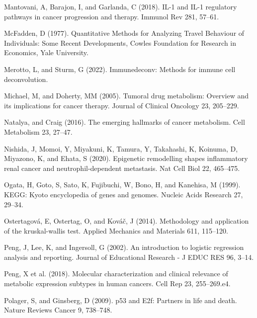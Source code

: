 \documentclass[
  parskip,
  oneside]{scrreprt}
\newlength{\cslhangindent}
\newlength{\cslentryspacingunit} %
\newenvironment{CSLReferences}[2] %
 {%
  \setlength{\parindent}{0pt}
  \ifodd #1
  \let\oldpar\par
  \def\par{\hangindent=\cslhangindent\oldpar}
  \fi
  \setlength{\parskip}{#2\cslentryspacingunit}
 }%
 {}
\begin{document}
\begin{CSLReferences}{0}{0}
\leavevmode{}%
Mantovani, A, Barajon, I, and Garlanda, C (2018). IL-1 and IL-1
regulatory pathways in cancer progression and therapy. Immunol Rev 281,
57--61.

\leavevmode{}%
McFadden, D (1977). {Quantitative Methods for Analyzing Travel Behaviour
of Individuals: Some Recent Developments}, Cowles Foundation for
Research in Economics, Yale University.

\leavevmode{}%
Merotto, L, and Sturm, G (2022). Immunedeconv: Methods for immune cell
deconvolution.

\leavevmode{}%
Michael, M, and Doherty, MM (2005). Tumoral drug metabolism: Overview
and its implications for cancer therapy. Journal of Clinical Oncology
23, 205--229.

\leavevmode{}%
Natalya, and Craig (2016). The emerging hallmarks of cancer metabolism.
Cell Metabolism 23, 27--47.

\leavevmode{}%
Nishida, J, Momoi, Y, Miyakuni, K, Tamura, Y, Takahashi, K, Koinuma, D,
Miyazono, K, and Ehata, S (2020). Epigenetic remodelling shapes
inflammatory renal cancer and neutrophil-dependent metastasis. Nat Cell
Biol 22, 465--475.

\leavevmode{}%
Ogata, H, Goto, S, Sato, K, Fujibuchi, W, Bono, H, and Kanehisa, M
(1999). KEGG: Kyoto encyclopedia of genes and genomes. Nucleic Acids
Research 27, 29--34.

\leavevmode{}%
Ostertagová, E, Ostertag, O, and Kováč, J (2014). Methodology and
application of the kruskal-wallis test. Applied Mechanics and Materials
611, 115--120.

\leavevmode{}%
Peng, J, Lee, K, and Ingersoll, G (2002). An introduction to logistic
regression analysis and reporting. Journal of Educational Research - J
EDUC RES 96, 3--14.

\leavevmode{}%
Peng, X et al. (2018). Molecular characterization and clinical relevance
of metabolic expression subtypes in human cancers. Cell Rep 23,
255--269.e4.

\leavevmode{}%
Polager, S, and Ginsberg, D (2009). p53 and E2f: Partners in life and
death. Nature Reviews Cancer 9, 738--748.


\end{CSLReferences}
\end{document}

